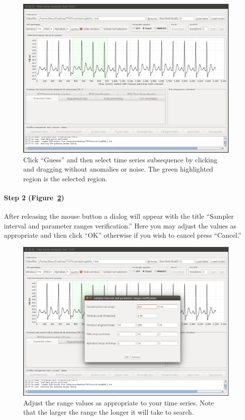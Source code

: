 \documentclass[titlepage, letterpaper, 12pt]{article}
\begin{document}
\begin{figure}[H]
	\centering
	\includegraphics[width=\textwidth]{pictures/motifguide/step1-guess}
	\caption{Click ``Guess'' and then select time series subsequence by clicking and dragging without anomalies or noise.  The green highlighted region is the selected region. }
	\label{fig:step1-guess}
\end{figure}


\paragraph{Step 2 (Figure~\ref{fig:step2-setrange})} After releasing the mouse button a dialog will appear with the title ``Sampler interval and parameter ranges verification.''  Here you may adjust the values as appropriate and then click ``OK'' otherwise if you wish to cancel press ``Cancel.''  

\begin{figure}[H]
	\centering
	\includegraphics[width=\textwidth]{pictures/motifguide/step2-setrange}
	\caption{Adjust the range values as appropriate to your time series.  Note that the larger the range the longer it will take to search. }
	\label{fig:step2-setrange}
\end{figure}
\end{document}

